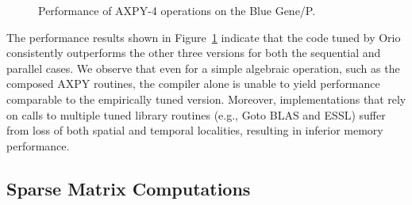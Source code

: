 \begin{figure}%
\begin{center} 
\end{center}
\caption{Performance of AXPY-4 operations on the Blue Gene/P.} 
\label{fig:axpy4-bgp-results} 
\end{figure} 

The performance results shown in Figure~\ref{fig:axpy4-bgp-results} indicate
that the code tuned by Orio consistently outperforms the other three versions
for both the sequential and parallel cases. We observe that even for a simple
algebraic operation, such as the composed AXPY routines, the compiler alone
is unable to yield performance comparable to the empirically tuned
version. Moreover, implementations that rely on calls to multiple tuned
library routines (e.g., Goto BLAS and ESSL) suffer from loss of both spatial
and temporal localities, resulting in inferior memory performance.

\subsection{Sparse Matrix Computations} 

